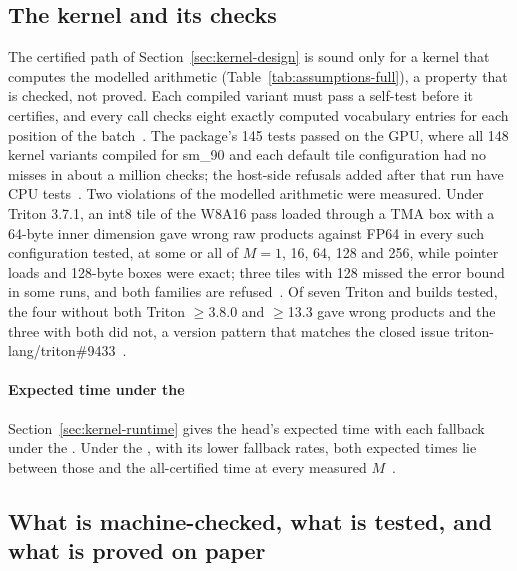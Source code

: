 \subsection{The kernel and its checks}\label{app:kernel-checks}
The certified path of Section~\ref{sec:kernel-design} is sound only for a kernel that computes the modelled arithmetic (Table~\ref{tab:assumptions-full}), a property that is checked, not proved. Each compiled variant must pass a self-test before it certifies, and every call checks eight exactly computed vocabulary entries for each position of the batch~. The package's 145 tests passed on the GPU, where all 148 kernel variants compiled for sm\_90 and each default tile configuration had no misses in about a million checks; the host-side refusals added after that run have CPU tests~. Two violations of the modelled arithmetic were measured. Under Triton 3.7.1, an int8 tile of the W8A16 pass loaded through a TMA box with a 64-byte inner dimension gave wrong raw products against FP64 in every such configuration tested, at some or all of $M=1$, 16, 64, 128 and 256, while pointer loads and 128-byte boxes were exact; three tiles with  128 missed the error bound in some runs, and both families are refused~. Of seven Triton and  builds tested, the four without both Triton $\ge$3.8.0 and  $\ge$13.3 gave wrong products and the three with both did not, a version pattern that matches the closed issue triton-lang/triton\#9433~.

\paragraph{Expected time under the \modelhopper{}} Section~\ref{sec:kernel-runtime} gives the head's expected time with each fallback under the \modelcons{}. Under the \modelhopper{}, with its lower fallback rates, both expected times lie between those and the all-certified time at every measured $M$~.

\subsection{What is machine-checked, what is tested, and what is proved on paper}\label{app:checked}\label{app:cpu}
